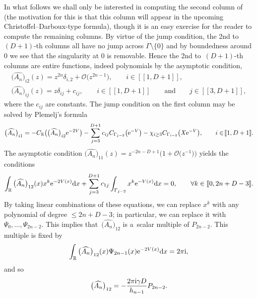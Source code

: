 \documentclass[pdftex]{sigma}
\numberwithin{equation}{section}
\begin{document}
In what follows we shall only be interested in computing the second column of  (the motivation for this is that this column will appear in the upcoming Christoffel--Darboux-type formula), though it is an easy exercise for the reader to compute the remaining columns. By virtue of the jump condition, the 2nd to $(D+1)$-th columns all have no jump across $\Gamma \setminus \{ 0 \}$ and by boundedness around $0$ we see that the singularity at $0$ is removable. Hence the 2nd to~$(D+1)$-th columns are entire functions, indeed polynomials by the asymptotic condition,
\begin{gather*}
\big( \widehat{A_n} \big)_{i2} (z) = z^{2n} \delta_{i,2}+\mathcal{O}\big(z^{2n-1}\big),\qquad i \in [\![1, D+1]\!], \\
\big( \widehat{A_n} \big)_{ij} (z) = z \delta_{ij} + c_{ij},\qquad i \in [\![1, D+1]\!] \qquad\text{and}\qquad j \in [\![3,D+1]\!],
\end{gather*}
where the $c_{ij}$ are constants. The jump condition on the first column may be solved by Plemelj's formula
\begin{gather*}
\big( \widehat{A_n} \big)_{i1} = - C_\mathbb{R}\big( \big(\widehat{A_n}\big)_{i2} {\rm e}^{-2V} \big) - \sum_{j=3}^{D+1} c_{ij} C_{\Gamma_{j-2}}\big( {\rm e}^{-V}\big) - \chi_{i \geq 3} C_{\Gamma_{i-2}}\big( \mathit{X} {\rm e}^{-V} \big),\qquad i \in \![\![ 1, D+1]\!].
\end{gather*}
The asymptotic condition $\big( \widehat{A_n} \big)_{11}(z) = z^{-2n-D+1}\big(1 + \mathcal{O}\big(z^{-1}\big)\big)$ yields the conditions
\begin{align*}
\int_\mathbb{R} \big(\widehat{A_n}\big)_{12}(x) x^k {\rm e}^{-2V(x)} {\rm d}x + \sum_{j=3}^{D+1} c_{1j} \int_{\Gamma_{j-2}} x^k {\rm e}^{-V(x)} {\rm d}x = 0,\qquad \forall k \in [\![0, 2n+D-3 ]\!] .
\end{align*}
By taking linear combinations of these equations, we can replace $x^k$ with any polynomial of degree $\leq 2n+D-3$; in particular, we can replace it with $\Psi_0, \dots, \Psi_{2n-2}$. This implies that~$\big(\widehat{A_n}\big)_{12}$ is a~scalar multiple of $P_{2n-2}$. This multiple is fixed by
\begin{align*}
\int_\mathbb{R} \big(\widehat{A_n}\big)_{12}(x) \Psi_{2n-1}(x) {\rm e}^{-2V(x)} {\rm d}x = 2 \pi {\rm i},
\end{align*}
and so
\begin{align}\label{12Ahat}
\big(\widehat{A_n}\big)_{12} = - \frac{2\pi {\rm i} \gamma D}{h_{n-1}} P_{2n-2}.
\end{align}
\end{document}
